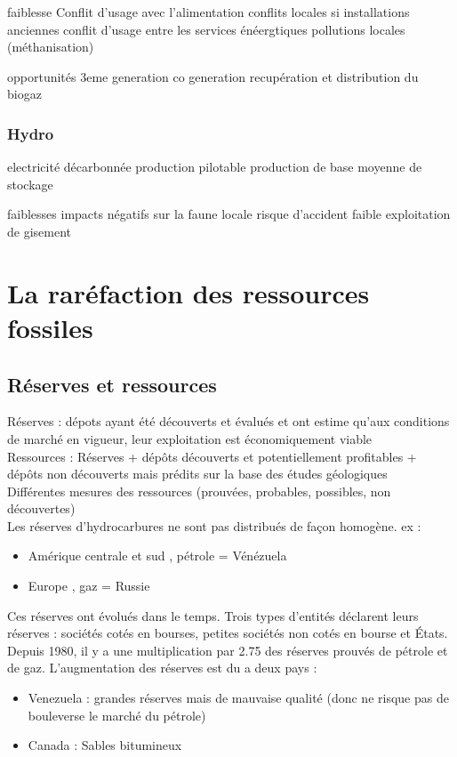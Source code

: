 \documentclass{article}
\begin{document}
faiblesse
Conflit d'usage avec l'alimentation
conflits locales si installations anciennes
conflit d'usage entre les services énéergtiques
pollutions locales (méthanisation)

opportunités
3eme generation
co generation
recupération et distribution du biogaz

\subsubsection{Hydro}
electricité décarbonnée
production pilotable
production de base
moyenne de stockage

faiblesses
impacts négatifs sur la faune locale
risque d'accident
faible exploitation de gisement


\section{La raréfaction des ressources fossiles}
\subsection{Réserves et ressources}
Réserves  : dépots ayant été découverts et évalués et ont estime qu'aux conditions de marché en vigueur, leur exploitation est économiquement viable \\
Ressources : Réserves + dépôts découverts et potentiellement profitables + dépôts non découverts mais prédits sur la base des études géologiques \\
Différentes mesures des ressources (prouvées, probables, possibles, non découvertes) \\ 
Les réserves d'hydrocarbures ne sont pas distribués de façon homogène.
ex : 
\begin{itemize}
	\item Amérique centrale et sud , pétrole = Vénézuela 
	\item Europe , gaz = Russie
\end{itemize} 

Ces réserves ont évolués dans le temps. Trois types d'entités déclarent leurs réserves : sociétés cotés en bourses, petites sociétés non cotés en bourse et États.
Depuis 1980, il y a une multiplication par 2.75 des réserves prouvés de pétrole et de gaz.
L'augmentation des réserves est du a deux pays  : 
\begin{itemize}
	\item Venezuela : grandes réserves mais de mauvaise qualité (donc ne risque pas de bouleverse le marché du pétrole)
	\item Canada : Sables bitumineux
\end{itemize}
\end{document}
